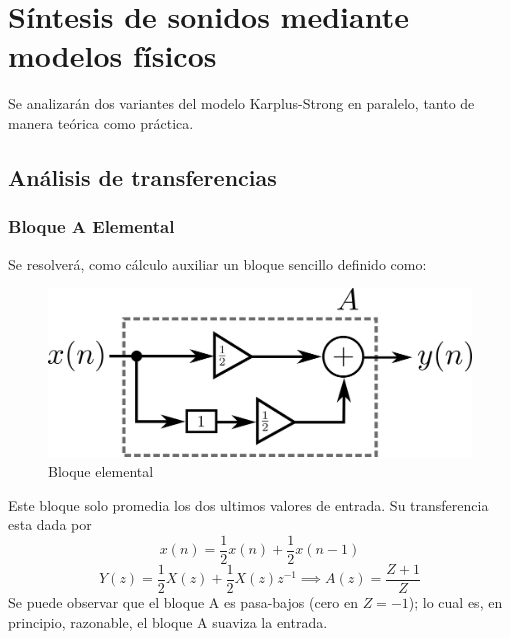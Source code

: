 \documentclass[assd_tp2_main.tex]{subfiles}
\begin{document}
\section{Síntesis de sonidos mediante modelos f\'isicos}
Se analizarán dos variantes del modelo Karplus-Strong en paralelo, tanto de manera teórica como práctica. 

\subsection{Análisis de transferencias}

\subsubsection{Bloque A Elemental}
Se resolverá, como cálculo auxiliar un bloque sencillo definido como:
\begin{figure}[H]	
	\centering
	\includegraphics[scale=1]{graficos/bloque1ej5.png}
	\caption{Bloque elemental}
	\label{fig:bloqueElemental}
\end{figure}

Este bloque solo promedia los dos ultimos valores de entrada. Su transferencia esta dada por
\begin{equation}
x(n)=\frac{1}{2}x(n)+\frac{1}{2}x(n-1)
\end{equation}
\begin{equation}
Y(z)=\frac{1}{2}X(z)+\frac{1}{2}X(z)z^{-1} \implies A(z)=\frac{Z+1}{Z}
\end{equation}
Se puede observar que el bloque A es pasa-bajos (cero en $Z=-1$); lo cual es, en principio, razonable, el bloque A suaviza la entrada.
\end{document}
